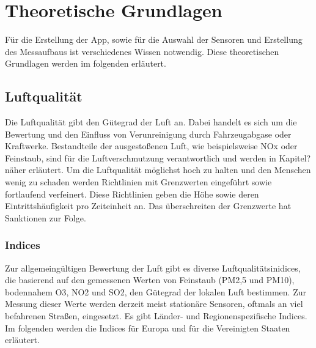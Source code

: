 
\chapter{Theoretische Grundlagen}\label{cha:Grundlagen}
Für die Erstellung der App, sowie für die Auswahl der Sensoren und Erstellung des Messaufbaus ist verschiedenes Wissen notwendig. Diese theoretischen Grundlagen werden im folgenden erläutert. 

\section{Luftqualität}\label{sec:Luftqualität}
Die Luftqualität gibt den Gütegrad der Luft an.  Dabei handelt es sich um die Bewertung und den Einfluss von Verunreinigung durch Fahrzeugabgase oder Kraftwerke. Bestandteile der ausgestoßenen Luft, wie beispielsweise \acf{NOx} oder Feinstaub, sind für die Luftverschmutzung verantwortlich und werden in Kapitel? näher erläutert.
Um die Luftqualität möglichst hoch zu halten und den Menschen wenig zu schaden werden Richtlinien mit Grenzwerten eingeführt sowie fortlaufend verfeinert. Diese Richtlinien geben die Höhe sowie deren Eintrittshäufigkeit pro Zeiteinheit an. Das überschreiten der Grenzwerte hat Sanktionen zur Folge. 
\subsection{Indices}
Zur allgemeingültigen Bewertung der Luft gibt es diverse Luftqualitätsinidices, die basierend auf den gemessenen Werten von Feinstaub (PM2,5 und PM10), bodennahem \acf{O3}, \ac{NO2} und \acf{SO2}, den Gütegrad der lokalen Luft bestimmen. Zur Messung dieser Werte werden derzeit meist stationäre Sensoren, oftmals an viel befahrenen Straßen, eingesetzt. 
\newline
Es gibt Länder- und Regionenspezifische Indices. Im folgenden werden die Indices für Europa und für die Vereinigten Staaten erläutert.

